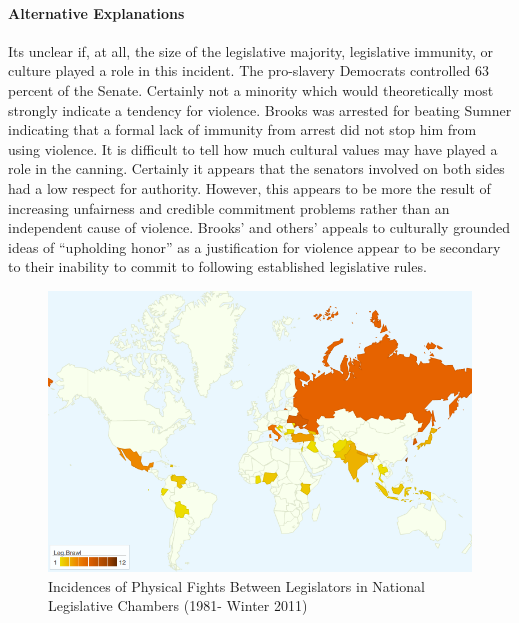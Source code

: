 \documentclass[a4paper]{article}\usepackage[]{graphicx}\usepackage[]{color}
\begin{document}
\paragraph{Alternative Explanations}

Its unclear if, at all, the size of the legislative majority, legislative immunity, or culture played a role in this incident. The pro-slavery Democrats controlled 63 percent of the Senate. Certainly not a minority which would theoretically most strongly indicate a tendency for violence. Brooks was arrested for beating Sumner indicating that a formal lack of immunity from arrest did not stop him from using violence. It is difficult to tell how much cultural values may have played a role in the canning. Certainly it appears that the senators involved on both sides had a low respect for authority. However, this appears to be more the result of increasing unfairness and credible commitment problems rather than an independent cause of violence. Brooks' and others' appeals to culturally grounded ideas of ``upholding honor'' \cite[555]{Pierson1995} as a justification for violence appear to be secondary to their inability to commit to following established legislative rules.

\begin{figure}[h!]
    \centering
    \caption{Incidences of Physical Fights Between Legislators in National Legislative Chambers (1981- Winter 2011)}
    \label{leg_map}
        \includegraphics[width = 13cm]{incidence_map.png}
\end{figure}
\end{document}
